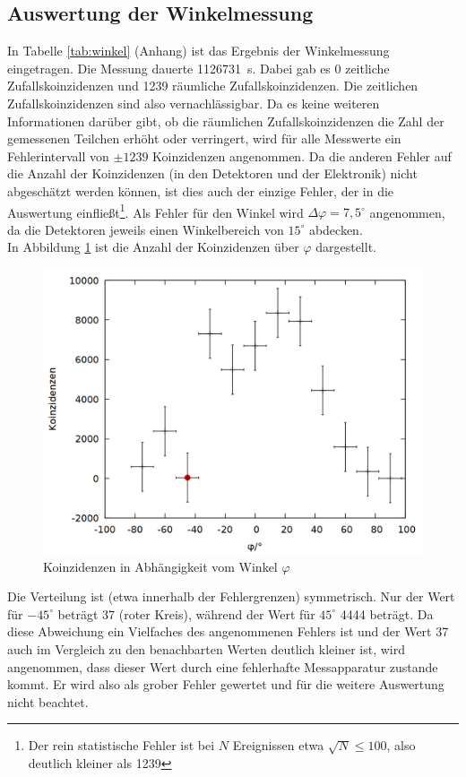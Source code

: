 \subsection{Auswertung der Winkelmessung}
In Tabelle \ref{tab:winkel} (Anhang) ist das Ergebnis der Winkelmessung eingetragen. Die Messung dauerte \SI{1126731}{\second}. Dabei gab es 0 zeitliche Zufallskoinzidenzen und 1239 räumliche Zufallskoinzidenzen. Die zeitlichen Zufallskoinzidenzen sind also vernachlässigbar. Da es keine weiteren Informationen darüber gibt, ob die räumlichen Zufallskoinzidenzen die Zahl der gemessenen Teilchen erhöht oder verringert, wird für alle Messwerte ein Fehlerintervall von $\pm 1239$ Koinzidenzen angenommen. Da die anderen Fehler auf die Anzahl der Koinzidenzen (in den Detektoren und der Elektronik) nicht abgeschätzt werden können, ist dies auch der einzige Fehler, der in die Auswertung einfließt\footnote{Der rein statistische Fehler ist bei $N$ Ereignissen etwa $\sqrt{N} \leq 100$, also deutlich kleiner als 1239}. Als Fehler für den Winkel wird $\Delta \varphi = 7,5^\circ$ angenommen, da die Detektoren jeweils einen Winkelbereich von $15^\circ$ abdecken.\\ 
In Abbildung \ref{fig:winkel} ist die Anzahl der Koinzidenzen über $\varphi$ dargestellt.

\begin{figure}
\centering
\includegraphics[width=0.75\linewidth]{data/friedrich/winkel.png}
\caption{Koinzidenzen in Abhängigkeit vom Winkel $\varphi$}
\label{fig:winkel}
\end{figure}

Die Verteilung ist (etwa innerhalb der Fehlergrenzen) symmetrisch. Nur der Wert für $-45^\circ$ beträgt 37 (roter Kreis), während der Wert für $45^\circ$ 4444 beträgt. Da diese Abweichung ein Vielfaches des angenommenen Fehlers ist und der Wert 37 auch im Vergleich zu den benachbarten Werten deutlich kleiner ist, wird angenommen, dass dieser Wert durch eine fehlerhafte Messapparatur zustande kommt. Er wird also als grober Fehler gewertet und für die weitere Auswertung nicht beachtet.\\

